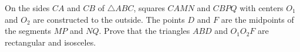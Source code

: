 On the sides $CA$ and $CB$ of $\triangle ABC$, squares $CAMN$ and $CBPQ$ with centers $O_1$ and $O_2$ are constructed to the outside. The points $D$ and $F$ are the midpoints of the segments $MP$ and $NQ$. Prove that the triangles $ABD$ and $O_1O_2F$ are rectangular and isosceles.
